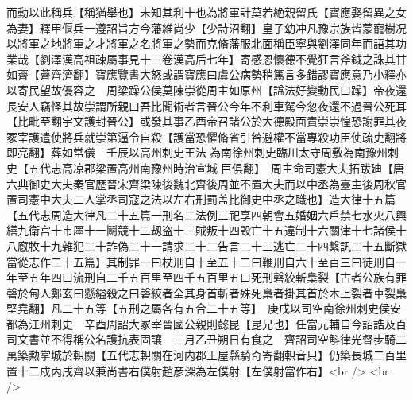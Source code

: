 而動以此稱兵【稱猶舉也】未知其利十也為將軍計莫若絶親留氏【寶應娶留異之女為妻】釋甲偃兵一遵詔旨方今藩維尚少【少詩沼翻】皇子幼冲凡豫宗族皆蒙寵樹况以將軍之地將軍之才將軍之名將軍之勢而克脩藩服北面稱臣寧與劉澤同年而語其功業哉【劉澤漢高祖疎屬事見十三卷漢高后七年】寄感恩懷德不覺狂言斧鉞之誅其甘如薺【薺齊濟翻】寶應覽書大怒或謂寶應曰虞公病勢稍篤言多錯謬寶應意乃小釋亦以寄民望故優容之　周梁躁公侯莫陳崇從周主如原州【諡法好變動民曰躁】帝夜還長安人竊怪其故崇謂所親曰吾比聞術者言晉公今年不利車駕今忽夜還不過晉公死耳【比毗至翻宇文護封晉公】或發其事乙酉帝召諸公於大德殿面責崇崇惶恐謝罪其夜冢宰護遣使將兵就崇第逼令自殺【護當恐懼脩省引咎避權不當專殺功臣使疏吏翻將即亮翻】葬如常儀　壬辰以高州刺史王法為南徐州刺史臨川太守周敷為南豫州刺史【五代志高凉郡梁置高州南豫州時治宣城巨俱翻】　周主命司憲大夫拓跋廸【唐六典御史大夫秦官歷晉宋齊梁陳後魏北齊後周並不置大夫而以中丞為臺主後周秋官置司憲中大夫二人掌丞司寇之法以左右刑罰盖比御史中丞之職也】造大律十五篇【五代志周造大律凡二十五篇一刑名二法例三祀享四朝會五婚姻六戶禁七水火八興繕九衛宫十市㕓十一鬭競十二刼盗十三賊叛十四毁亡十五違制十六關津十七諸侯十八廐牧十九雜犯二十詐偽二十一請求二十二告言二十三逃亡二十四繫訊二十五斷獄當從志作二十五篇】其制罪一曰杖刑自十至五十二曰鞭刑自六十至百三曰徒刑自一年至五年四曰流刑自二千五百里至四千五百里五曰死刑磬絞斬梟裂【古者公族有罪磬於甸人鄭玄曰懸縊殺之曰磬絞者全其身首斬者殊死梟者掛其首於木上裂者車裂梟堅堯翻】凡二十五等【五刑之屬各有五合二十五等】　庚戌以司空南徐州刺史侯安都為江州刺史　辛酉周詔大冢宰晉國公親則懿昆【昆兄也】任當元輔自今詔誥及百司文書並不得稱公名護抗表固讓　三月乙丑朔日有食之　齊詔司空斛律光督步騎二萬築勲掌城於軹關【五代志軹關在河内郡王屋縣騎奇寄翻軹音只】仍築長城二百里置十二戍丙戌齊以兼尚書右僕射趙彦深為左僕射【左僕射當作右】<br />
<br />
